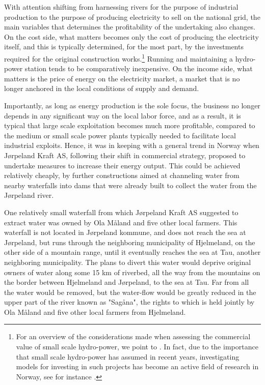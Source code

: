 With attention shifting from harnessing rivers for the purpose of industrial production to the purpose of producing electricity to sell on the national grid, the main variables that determines the profitability of the undertaking also changes. On the cost side, what matters becomes only the cost of producing the electricity itself, and this is typically determined, for the most part, by the investments required for the original construction works.\footnote{For an overview of the considerations made when assessing the commercial value of small scale hydro-power, we point to \cite{kartlegging}. In fact, due to the importance that small scale hydro-power has assumed in recent years, investigating models for investing in such projects has become an active field of research in Norway, see for instance \cite{investment}.} Running and maintaining a hydro-power station tends to be comparatively inexpensive. On the income side, what matters is the price of energy on the electricity market, a market that is no longer anchored in the local conditions of supply and demand.

Importantly, as long as energy production is the sole focus, the business no longer depends in any significant way on the local labor force, and as a result, it is typical that large scale exploitation becomes much more profitable, compared to the medium or small scale power plants typically needed to facilitate local industrial exploits. Hence, it was in keeping with a general trend in Norway when Jørpeland Kraft AS, following their shift in commercial strategy, proposed to undertake measures to increase their energy output. This could be achieved relatively cheaply, by further constructions aimed at channeling water from nearby waterfalls into dams that were already built to collect the water from the Jørpeland river.

One relatively small waterfall from which Jørpeland Kraft AS suggested to extract water was owned by Ola Måland and five other local farmers. This waterfall is not located in Jørpeland kommune, and does not reach the sea at Jørpeland, but runs through the neighboring municipality of Hjelmeland, on the other side of a mountain range, until it eventually reaches the sea at Tau, another neighboring municipality. The plans to divert this water would deprive original owners of water along some 15 km of riverbed, all the way from the mountains on the border between Hjelmeland and Jørpeland, to the sea at Tau. Far from all the water would be removed, but the water-flow would be greatly reduced in the upper part of the river known as "Sagåna", the rights to which is held jointly by Ola Måland and five other local farmers from Hjelmeland. 

